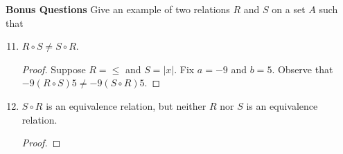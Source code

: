 \documentclass{article}
\begin{document}
  \textbf{Bonus Questions}
  Give an example of two relations $R$ and $S$ on a set $A$ such that \\
  \begin{enumerate} \setcounter{enumi}{10}
    \item $R \circ S \neq S \circ R$.
      \begin{proof}
        Suppose $R = \le$ and $S = |x|$. Fix $a = -9$ and $b = 5$. Observe that $-9 (R \circ S)5 \neq -9 (S \circ R) 5$.  
      \end{proof}
    \item $S \circ R$ is an equivalence relation, but neither $R$ nor $S$ is an equivalence relation.
      \begin{proof}
        
      \end{proof}
   \end{enumerate}
\end{document}
